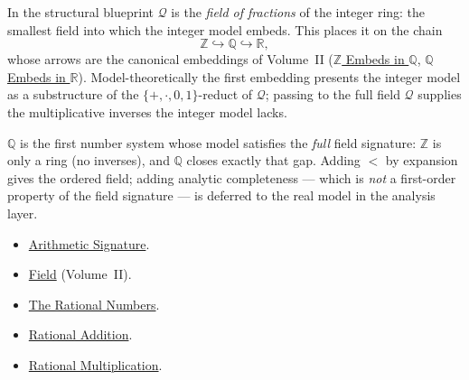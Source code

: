 \begin{remark*}
In the structural blueprint $\mathcal{Q}$ is the \emph{field of fractions} of the
integer ring: the smallest field into which the integer model embeds. This
places it on the chain
\[
\mathbb{Z}\hookrightarrow\mathbb{Q}\hookrightarrow\mathbb{R},
\]
whose arrows are the canonical embeddings of Volume~II
(\hyperref[thm:z-embeds-in-q]{$\mathbb{Z}$ Embeds in $\mathbb{Q}$},
\hyperref[thm:q-embeds-in-r]{$\mathbb{Q}$ Embeds in $\mathbb{R}$}).
Model-theoretically the first embedding presents the integer model as a
substructure of the $\{+,\cdot,0,1\}$-reduct of $\mathcal{Q}$; passing to the
full field $\mathcal{Q}$ supplies the multiplicative inverses the integer model
lacks.
\end{remark*}

\begin{remark*}[Interpretation]
$\mathbb{Q}$ is the first number system whose model satisfies the \emph{full}
field signature: $\mathbb{Z}$ is only a ring (no inverses), and $\mathbb{Q}$
closes exactly that gap. Adding $<$ by expansion gives the ordered field; adding
analytic completeness --- which is \emph{not} a first-order property of the field
signature --- is deferred to the real model in the analysis layer.
\end{remark*}

\begin{dependencies}
\begin{itemize}
  \item \hyperref[def:arithmetic-signature]{Arithmetic Signature}.
  \item \hyperref[def:algebraic-field]{Field} (Volume~II).
  \item \hyperref[def:rationals]{The Rational Numbers}.
  \item \hyperref[def:addition-on-q-classes]{Rational Addition}.
  \item \hyperref[def:multiplication-on-q-classes]{Rational Multiplication}.
\end{itemize}
\end{dependencies}
